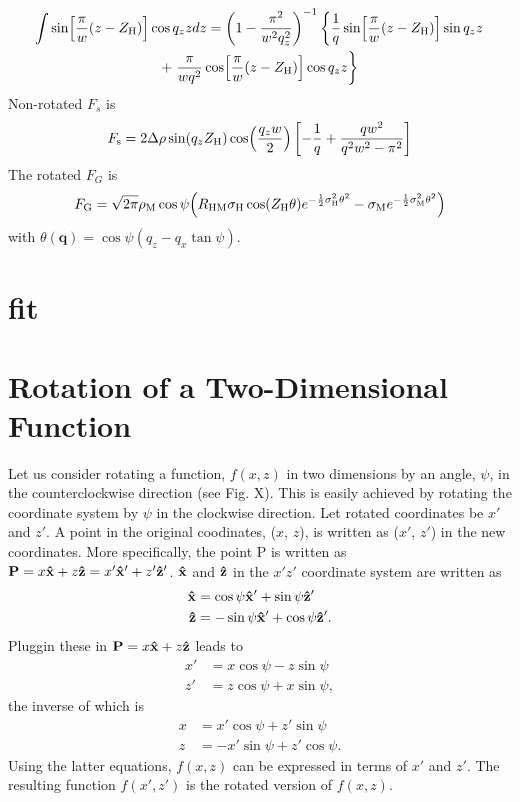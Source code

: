 \documentclass[12pt,letterpaper]{article}
\newcommand{\zh}{Z_\mathrm{H}}
\newcommand{\sigmah}{\sigma_\mathrm{H}}
\newcommand{\sigmam}{\sigma_\mathrm{M}}
\newcommand{\rhom}{\rho_\mathrm{M}}
\newcommand{\rhm}{R_\mathrm{HM}}
\begin{document}
\begin{multline}
  \int \sin\bracks{\frac{\pi}{w}(z-\zh)} \cos q_zz dz
  = \left(1-\frac{\pi^2}{w^2q_z^2}\right)^{-1} 
  \left\{\frac{1}{q} \sin\bracks{\frac{\pi}{w}(z-\zh)} \sin q_zz\right. \\
  + \left.\frac{\pi}{wq^2}\cos\bracks{\frac{\pi}{w}(z-\zh)}\cos q_zz\right\}
\end{multline}
Non-rotated $F_s$ is
\begin{equation}
  F_\mathrm{s} = 2\Delta\rho\sin(q_z\zh)\cos\pars{\frac{q_zw}{2}}
                 \left[-\frac{1}{q}+\frac{qw^2}{q^2w^2-\pi^2}\right] 
\end{equation}
The rotated $F_G$ is
\begin{equation}
  F_\mathrm{G} = \sqrt{2\pi}\rhom\cos\psi \pars{
  \rhm\sigmah\cos(\zh\theta) e^{-\frac{1}{2}\sigmah^2\theta^2}
  -\sigmam e^{-\frac{1}{2}\sigmam^2\theta^2}}
\end{equation}
with $\theta(\mathbf{q})=\cos\psi(q_z-q_x\tan\psi)$.

\section{fit}

\appendix
\section{Rotation of a Two-Dimensional Function}
Let us consider rotating a function, $f(x,z)$ in two dimensions by an angle, 
$\psi$, in the counterclockwise direction (see Fig. X). This is easily 
achieved by rotating the coordinate system by $\psi$ in the clockwise direction. 
Let rotated coordinates be $x'$ and $z'$. A point in the original coodinates,
($x$, $z$), is written as ($x'$, $z'$) in the new coordinates. More specifically,
the point P is written as 
$\mathbf{P}=x\mathbf{\hat{x}}+z\mathbf{\hat{z}}=x'\mathbf{\hat{x}}'+z'\mathbf{\hat{z}}'$. $\mathbf{\hat{x}}$ and $\mathbf{\hat{z}}$ in
the $x'z'$ coordinate system are written as 
\begin{align}
  \mathbf{\hat{x}} &= \cos\psi\mathbf{\hat{x}}'+\sin\psi\mathbf{\hat{z}}' \\
  \mathbf{\hat{z}} &= -\sin\psi\mathbf{\hat{x}}'+\cos\psi\mathbf{\hat{z}}'.
\end{align}
Pluggin these in $\mathbf{P}=x\mathbf{\hat{x}}+z\mathbf{\hat{z}}$ leads to
\begin{align}
  x' &= x\cos\psi - z\sin\psi \\
  z' &= z\cos\psi + x\sin\psi,
\end{align}
the inverse of which is
\begin{align}
  x &= x'\cos\psi + z'\sin\psi \\
  z &= -x'\sin\psi + z'\cos\psi.
\end{align}
Using the latter equations, $f(x,z)$ can be expressed in terms of $x'$ and $z'$. 
The resulting function $f(x',z')$ is the rotated version of $f(x,z)$. 
\end{document}
